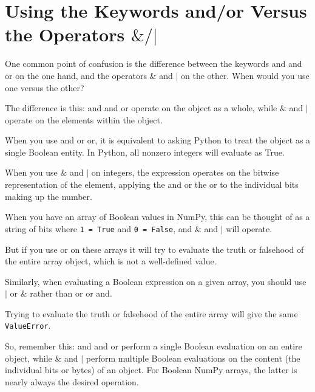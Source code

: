 \section{Using the Keywords and/or Versus the Operators $\&/|$}
One common point of confusion is the difference between the keywords and and or
on the one hand, and the operators $\&$ and $|$ on the other. When would you use one versus the other?

The difference is this: and and or operate on the object as a whole, while $\&$ and $|$
operate on the elements within the object.

When you use and or or, it is equivalent to asking Python to treat the object as a single Boolean entity. In Python, all nonzero integers will evaluate as True.

When you use $\&$ and $|$ on integers, the expression operates on the bitwise representation of the element, applying the and or the or to the individual bits making up the
number.

When you have an array of Boolean values in NumPy, this can be thought of as a
string of bits where \verb|1 = True| and \verb|0 = False|, and \& and $|$ will operate.

But if you use or on these arrays it will try to evaluate the truth or falsehood of the
entire array object, which is not a well-defined value.

Similarly, when evaluating a Boolean expression on a given array, you should use $|$ or
\& rather than or or and.

Trying to evaluate the truth or falsehood of the entire array will give the same
\verb|ValueError|.

So, remember this: and and or perform a single Boolean evaluation on an entire
object, while \& and $|$ perform multiple Boolean evaluations on the content (the individual bits or bytes) of an object. For Boolean NumPy arrays, the latter is nearly
always the desired operation.
